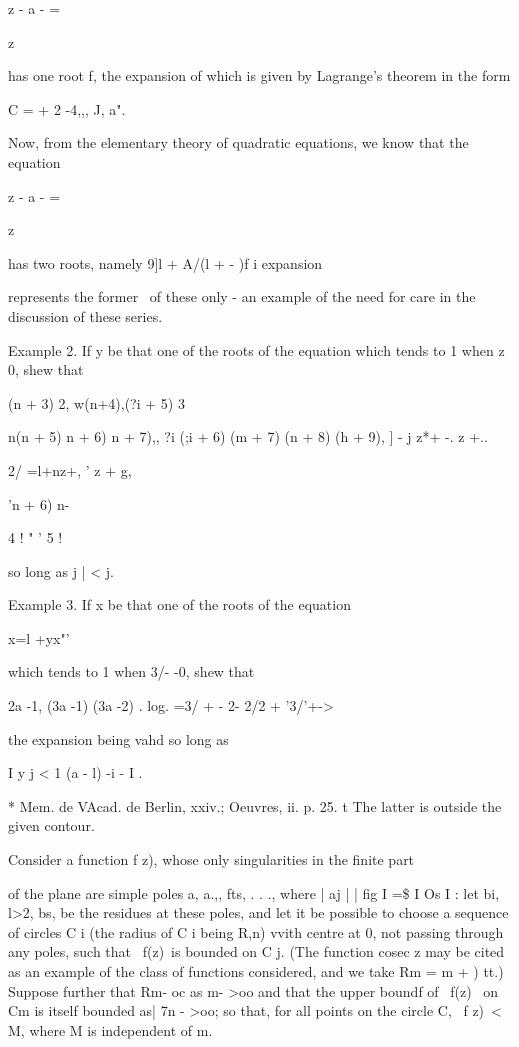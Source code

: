 z - a - =

z

has one root f, the expansion of which is given by Lagrange's theorem
in the form

C = + 2 -4,,, J, a".

Now, from the elementary theory of quadratic equations, we know that
the equation

z - a - =

z

has two roots, namely 9]l + A/(l + - )f i %
expansion

represents the former \ of these only - an example of the need for
care in the discussion of these series.

Example 2. If y be that one of the roots of the equation which tends
to 1 when z~ 0, shew that

 (n + 3) 2, w(n+4),(?i + 5) 3

n(n + 5) n + 6) n + 7),, ?i (;i + 6) (m + 7) (n + 8) (h + 9), ] - j
z*+ -. z +..

2/ =l+nz+, ' z + g,

'n + 6) n-

4 ! " ' 5 !

so long as j | < j.

Example 3. If x be that one of the roots of the equation

x=l +yx"'

which tends to 1 when 3/- -0, shew that

2a -1, (3a -1) (3a -2) . log. =3/ + - 2- 2/2 + '3/'+->

the expansion being vahd so long as

I y j < 1 (a - l) -i - I . 

* Mem. de VAcad. de Berlin, xxiv.; Oeuvres, ii. p. 25. t The latter is
outside the given contour.

%
%


  Consider a function f z), whose only singularities in the finite
part

of the plane are simple poles a, a.,, fts, . . ., where | aj | | fig
I =\$ I Os I   : let bi, l>2, bs,  be the residues at these
poles, and let it be possible to choose a sequence of circles C i (the
radius of C i being R,n) vvith centre at 0, not passing through any
poles, such that \ f(z)\ is bounded on C j. (The function cosec z may
be cited as an example of the class of functions considered, and we
take Rm = m + ) tt.) Suppose further that Rm- oc as m- >oo and that
the upper boundf of \ f(z) \ on Cm is itself bounded as| 7n - >oo; so
that, for all points on the circle C, \ f z)\ < M, where M is
independent of m.

